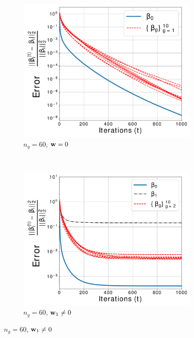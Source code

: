\begin{figure}[t!]
	\centering
	\begin{subfigure}[b]{0.2175\textwidth}
		\includegraphics[width=\textwidth]{./img/betag_converge_G10_p100.pdf}				
		\caption{$n_g = 60$, $\mathbf{w} = 0$}\label{fig syn1a}
	\end{subfigure} ~
	\begin{subfigure}[b]{0.2175\textwidth}
		\includegraphics[width=\textwidth]{./img/betag_converge_noise_G10_p100.pdf}				
		\caption{$n_g = 60$, $\mathbf{w}_1 \neq 0$}\label{fig syn1b}
	\end{subfigure}

\end{figure}
